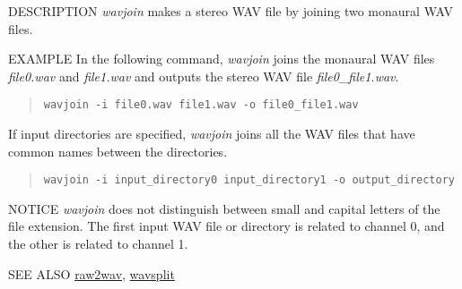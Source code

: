 \begin{synopsis}
\item[wavjoin] [ --i $I$ ] [ --o $O$]
\end{synopsis}

\begin{qsection}{DESCRIPTION}
{\em wavjoin} makes a stereo WAV file by joining two monaural WAV files.

\end{qsection}

\begin{options}
\end{options}

\begin{qsection}{EXAMPLE}
 In the following command, {\em wavjoin} joins the monaural WAV files {\em file0.wav} and {\em file1.wav} 
 and outputs the stereo WAV file {\em file0\_file1.wav}.
\begin{quote}
 \verb!wavjoin -i file0.wav file1.wav -o file0_file1.wav!
\end{quote}
 If input directories are specified, {\em wavjoin} joins all the WAV files 
 that have common names between the directories.
\begin{quote}
  \verb!wavjoin -i input_directory0 input_directory1 -o output_directory!
\end{quote}
\end{qsection}

\begin{qsection}{NOTICE}
 {\em wavjoin} does not distinguish between small and capital letters of the file extension.
 The first input WAV file or directory is related to channel 0, and the other is related to channel 1.
\end{qsection}

\begin{qsection}{SEE ALSO}
\hyperlink{raw2wav}{raw2wav},
\hyperlink{wavsplit}{wavsplit}
\end{qsection}
